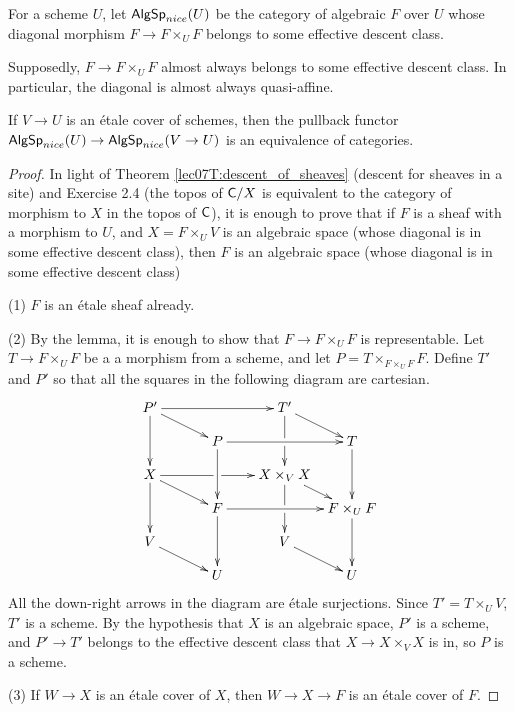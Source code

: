 \begin{definition}
 For a scheme $U$, let $\text{\sf AlgSp}_{nice}(U)$ be the category of algebraic $F$ over $U$ whose diagonal morphism $F\to F\times_U F$ belongs to some effective descent class.
\end{definition}
 Supposedly, $F\to F\times_U F$ almost always belongs to some effective descent class. In particular, the diagonal is almost always quasi-affine. 
\begin{theorem} \label{ApdxT:descent_alg_spaces}
 If $V\to U$ is an \'etale cover of schemes, then the pullback functor $\text{\sf AlgSp}_{nice}(U)\to \text{\sf AlgSp}_{nice}(V\to U)$ is an equivalence of categories.
\end{theorem}
 \begin{proof}
   In light of Theorem \ref{lec07T:descent_of_sheaves} (descent for sheaves in a site)
   and Exercise 2.4 (the topos of $\text{\sf C}/X$ is equivalent to the category of morphism to $X$
   in the topos of $\text{\sf C}$), it is enough to prove that if $F$ is a sheaf with a morphism to
   $U$, and $X=F\times_U V$ is an algebraic space (whose diagonal is in some effective
   descent class), then $F$ is an algebraic space (whose diagonal is in some effective
   descent class)

   (1) $F$ is an \'etale sheaf already.

   (2) By the lemma, it is enough to show that $F\to F\times_U F$ is representable. Let
   $T\to F\times_U F$ be a a morphism from a scheme, and let $P=T\times_{F\times_U F}F$.
   Define $T'$ and $P'$ so that all the squares in the following diagram are
   cartesian.
   \[\xymatrix@!0 @C+2pc{
    P'\ar[dd]\ar[rr]\ar[dr] & & T'\ar[dd]|\hole \ar[dr]\\
        & P\ar[rr]\ar[dd] & & T\ar[dd]\\
    X\ar[rr]|\hole \ar[dd]\ar[dr] & & X\times_V X \ar[dd]|\hole \ar[dr]\\
        & F\ar[dd]\ar[rr] & & F\times_U F\ar[dd]\\
    V\ar[dr] & & V\ar[dr]\\
        & U & & U
   }\]
    All the down-right arrows in the diagram are \'etale surjections. Since $T'=T\times_U
   V$, $T'$ is a scheme. By the hypothesis that $X$ is an algebraic space, $P'$ is a
   scheme, and $P'\to T'$ belongs to the effective descent class that $X\to X\times_V X$
   is in, so $P$ is a scheme.

   (3) If $W\to X$ is an \'etale cover of $X$, then $W\to X\to F$ is an \'etale cover of
   $F$.
 \end{proof}

